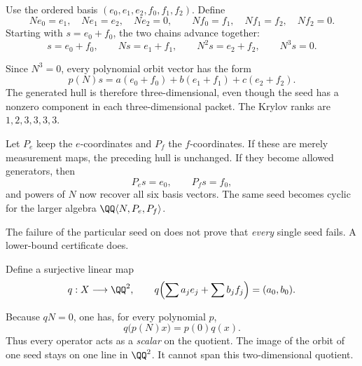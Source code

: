 Use the ordered basis $(e_0,e_1,e_2,f_0,f_1,f_2)$. Define
\[
Ne_0=e_1,\quad Ne_1=e_2,\quad Ne_2=0,
\qquad Nf_0=f_1,\quad Nf_1=f_2,\quad Nf_2=0.
\]
Starting with $s=e_0+f_0$, the two chains advance together:
\[
s=e_0+f_0,\qquad Ns=e_1+f_1,\qquad N^2s=e_2+f_2,\qquad N^3s=0.
\]


Since $N^3=0$, every polynomial orbit vector has the form
\[
p(N)s=a(e_0+f_0)+b(e_1+f_1)+c(e_2+f_2).
\]
The generated hull is therefore three-dimensional, even though the seed has a nonzero component in each three-dimensional packet. The Krylov ranks are $1,2,3,3,3,3$.

Let $P_e$ keep the $e$-coordinates and $P_f$ the $f$-coordinates. If these are merely measurement maps, the preceding hull is unchanged. If they become allowed generators, then
\[
P_es=e_0,\qquad P_fs=f_0,
\]
and powers of $N$ now recover all six basis vectors. The same seed becomes cyclic for the larger algebra $\QQ\langle N,P_e,P_f\rangle$.


The failure of the particular seed on  does not prove that \emph{every} single seed fails. A lower-bound certificate does.

Define a surjective linear map
\[
q:X\longrightarrow\QQ^2,\qquad
q\Bigl(\sum a_je_j+\sum b_jf_j\Bigr)=(a_0,b_0).
\]


Because $qN=0$, one has, for every polynomial $p$,
\[
q\bigl(p(N)x\bigr)=p(0)q(x).
\]
Thus every operator acts as a \emph{scalar} on the quotient. The image of the orbit of one seed stays on one line in $\QQ^2$. It cannot span this two-dimensional quotient.

